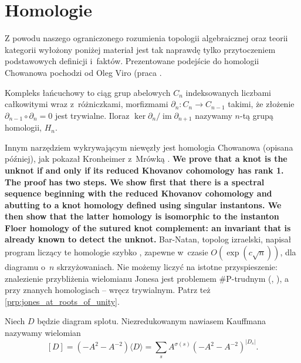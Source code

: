 \section{Homologie} %

Z powodu naszego ograniczonego rozumienia topologii algebraicznej oraz teorii kategorii
wyłożony poniżej materiał jest tak naprawdę tylko przytoczeniem podstawowych definicji i~faktów.
Prezentowane podejście do homologii Chowanowa pochodzi od Oleg Viro (praca \cite{viro04}.

Kompleks łańcuchowy to ciąg grup abelowych $C_n$ indeksowanych liczbami całkowitymi
wraz z~różniczkami, morfizmami $\partial_n \colon C_n \to C_{n-1}$ takimi,
że złożenie $\partial_{n-1} \circ \partial_n = 0$ jest trywialne.
Iloraz $\ker \partial_n / \operatorname{im} \partial_{n+1}$ nazywamy $n$-tą grupą homologii, $H_n$.

Innym narzędziem wykrywającym niewęzły jest homologia Chowanowa (opisana później),
jak pokazał Kronheimer z~Mrówką \cite{kronheimer11}.
\textbf{We prove that a knot is the unknot if and only if its reduced Khovanov cohomology has rank 1. The proof has two steps. We show first that there is a spectral sequence beginning with the reduced Khovanov cohomology and abutting to a knot homology defined using singular instantons. We then show that the latter homology is isomorphic to the instanton Floer homology of the sutured knot complement: an invariant that is already known to detect the unknot.}
Bar-Natan, topolog izraelski, napisał program liczący te homologie szybko \cite{barnatan07},
zapewne w~czasie $O(\exp(c \sqrt n))$, dla diagramu o~$n$ skrzyżowaniach.
Nie możemy liczyć na istotne przyspieszenie:
znalezienie przybliżenia wielomianu Jonesa jest problemem \#P-trudnym (\cite{kuperberg15}, \cite{vertigan05}),
a przy znanych homologiach -- wręcz trywialnym.
Patrz też \ref{prp:jones_at_roots_of_unity}.


\begin{definition}
    Niech $D$ będzie diagram splotu.
    Niezredukowanym nawiasem Kauffmana nazywamy wielomian
    \[
        [D] = (-A^2 - A^{-2}) \langle D \rangle = \sum_s A^{\sigma(s)} (-A^2 - A^{-2})^{|D_s|}.
    \]
\end{definition}

